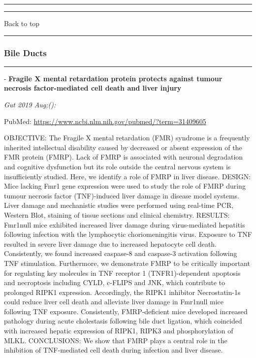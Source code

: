 \documentclass[]{article}
\begin{document}
\begin{center}\rule{0.5\linewidth}{\linethickness}\end{center}

\begin{center}\rule{0.5\linewidth}{\linethickness}\end{center}

Back to top

\begin{center}\rule{0.5\linewidth}{\linethickness}\end{center}

\pagebreak

\hypertarget{bile-ducts}{%
\subsubsection{Bile Ducts}\label{bile-ducts}}

\begin{center}\rule{0.5\linewidth}{\linethickness}\end{center}

 - \textbf{Fragile X mental retardation protein protects against tumour
necrosis factor-mediated cell death and liver injury}

\emph{Gut 2019 Aug;():}

PubMed: \url{https://www.ncbi.nlm.nih.gov/pubmed/?term=31409605}

OBJECTIVE: The Fragile X mental retardation (FMR) syndrome is a
frequently inherited intellectual disability caused by decreased or
absent expression of the FMR protein (FMRP). Lack of FMRP is associated
with neuronal degradation and cognitive dysfunction but its role outside
the central nervous system is insufficiently studied. Here, we identify
a role of FMRP in liver disease. DESIGN: Mice lacking Fmr1 gene
expression were used to study the role of FMRP during tumour necrosis
factor (TNF)-induced liver damage in disease model systems. Liver damage
and mechanistic studies were performed using real-time PCR, Western
Blot, staining of tissue sections and clinical chemistry. RESULTS:
Fmr1null mice exhibited increased liver damage during virus-mediated
hepatitis following infection with the lymphocytic choriomeningitis
virus. Exposure to TNF resulted in severe liver damage due to increased
hepatocyte cell death. Consistently, we found increased caspase-8 and
caspase-3 activation following TNF stimulation. Furthermore, we
demonstrate FMRP to be critically important for regulating key molecules
in TNF receptor 1 (TNFR1)-dependent apoptosis and necroptosis including
CYLD, c-FLIPS and JNK, which contribute to prolonged RIPK1 expression.
Accordingly, the RIPK1 inhibitor Necrostatin-1s could reduce liver cell
death and alleviate liver damage in Fmr1null mice following TNF
exposure. Consistently, FMRP-deficient mice developed increased
pathology during acute cholestasis following bile duct ligation, which
coincided with increased hepatic expression of RIPK1, RIPK3 and
phosphorylation of MLKL. CONCLUSIONS: We show that FMRP plays a central
role in the inhibition of TNF-mediated cell death during infection and
liver disease.
\end{document}
